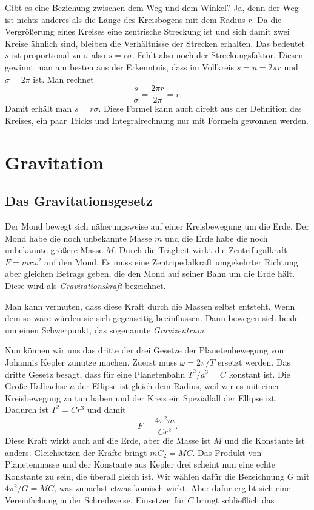 \documentclass[a4paper,10pt,fleqn,twocolumn,twoside]{article}
\begin{document}
Gibt es eine Beziehung zwischen dem Weg und dem Winkel? Ja,
denn der Weg ist nichts anderes als die Länge des Kreisbogens
mit dem Radius \(r\). Da die Vergrößerung eines Kreises eine
zentrische Streckung ist und sich damit zwei Kreise ähnlich
sind, bleiben die Verhältnisse der Strecken erhalten.
Das bedeutet \(s\) ist proportional zu \(\sigma\) also \(s=c\sigma\).
Fehlt also noch der Streckungsfaktor. Diesen gewinnt man am besten
aus der Erkenntnis, dass im Vollkreis \(s=u=2\pi r\) und
\(\sigma = 2\pi\) ist. Man rechnet
\[\frac{s}{\sigma} = \frac{2\pi r}{2\pi} = r.\]
%
Damit erhält man \(s=r\sigma\). Diese Formel kann auch direkt
aus der Definition des Kreises, ein paar Tricks und Integralrechnung
nur mit Formeln gewonnen werden.

\section{Gravitation}

\subsection{Das Gravitationsgesetz}

Der Mond bewegt sich näherungsweise auf einer Kreisbewegung um die
Erde. Der Mond habe die noch unbekannte Masse \(m\) und die Erde habe
die noch unbekannte größere Masse \(M\). Durch die Trägheit wirkt die
Zentrifugalkraft \(F=mr\omega^2\) auf den Mond. Es muss eine
Zentripedalkraft umgekehrter Richtung aber gleichen Betrags geben,
die den Mond auf seiner Bahn um die Erde hält.
Diese wird als \textit{Gravitationskraft} bezeichnet.

Man kann vermuten, dass diese Kraft durch die Massen selbst entsteht.
Wenn dem so wäre würden sie sich gegenseitig beeinflussen. Dann
bewegen sich beide um einen Schwerpunkt,
das sogenannte \textit{Gravizentrum}.

Nun können wir uns das dritte der drei Gesetze der Planetenbewegung
von Johannis Kepler zunutze machen. Zuerst muss \(\omega=2\pi/T\)
ersetzt werden. Das dritte Gesetz besagt, dass für eine
Planetenbahn \(T^2/a^3=C\) konstant ist. Die Große Halbachse
\(a\) der Ellipse ist gleich dem Radius, weil wir es mit einer
Kreisbewegung zu tun haben und der Kreis ein Spezialfall der
Ellipse ist. Dadurch ist \(T^2=Cr^3\) und damit
\[F = \frac{4\pi^2 m}{Cr^2}.\]
Diese Kraft wirkt auch auf die Erde, aber die Masse ist \(M\)
und die Konstante ist anders. Gleichsetzen der Kräfte
bringt \(mC_2=MC\). Das Produkt von Planetenmasse und der Konstante
aus Kepler drei scheint nun eine echte Konstante zu sein, die überall
gleich ist. Wir wählen dafür
die Bezeichnung \(G\) mit \(4\pi^2/G=MC\), was zunächst etwas komisch
wirkt. Aber dafür ergibt sich eine Vereinfachung in der Schreibweise.
Einsetzen für \(C\) bringt schließlich das
\end{document}
